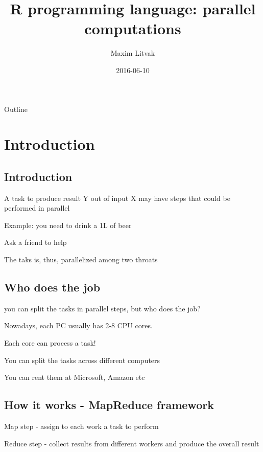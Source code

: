\documentclass[bigger]{beamer}
\author{Maxim Litvak}
\date{2016-06-10}
\title{R programming language: parallel computations}
\begin{document}
\maketitle
\begin{frame}{Outline}
\tableofcontents
\end{frame}

\section{Introduction}
\label{sec-1}
\subsection{Introduction}
\label{sec-1-1}
\begin{frame}[label=sec-1-1-1]{A task to produce result Y out of input X may have steps that could be performed in parallel}
\end{frame}
\begin{frame}[label=sec-1-1-2]{Example: you need to drink a 1L of beer}
\begin{block}{Ask a friend to help}
\end{block}
\begin{block}{The taks is, thus, parallelized among two throats}
\end{block}
\end{frame}
\subsection{Who does the job}
\label{sec-1-2}
\begin{frame}[label=sec-1-2-1]{you can split the tasks in parallel steps, but who does the job?}
\end{frame}
\begin{frame}[label=sec-1-2-2]{Nowadays, each PC usually has 2-8 CPU cores.}
\begin{block}{Each core can process a task!}
\end{block}
\end{frame}
\begin{frame}[label=sec-1-2-3]{You can split the tasks across different computers}
\begin{block}{You can rent them at Microsoft, Amazon etc}
\end{block}
\end{frame}
\subsection{How it works - MapReduce framework}
\label{sec-1-3}
\begin{frame}[label=sec-1-3-1]{Map step - assign to each work a task to perform}
\end{frame}
\begin{frame}[label=sec-1-3-2]{Reduce step - collect results from different workers and produce the overall result}
\end{frame}
\end{document}
